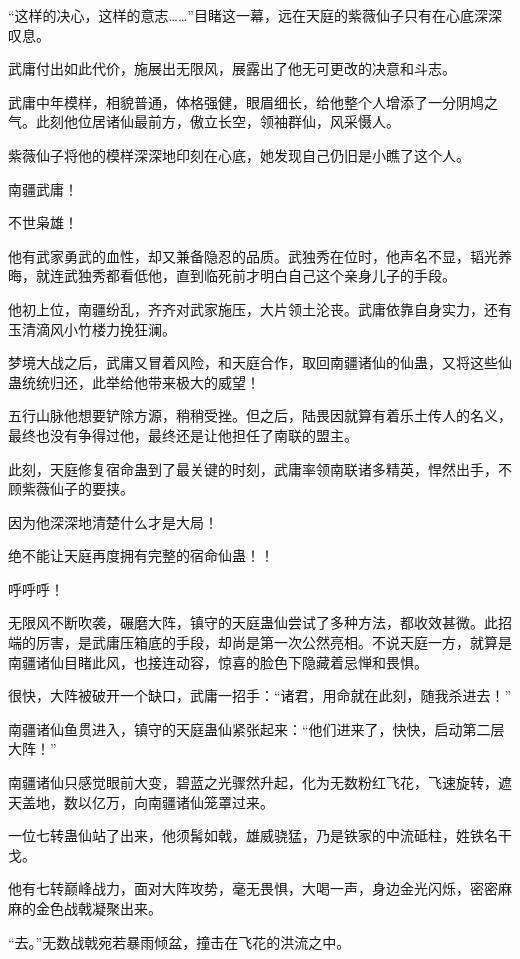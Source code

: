 \begin{this_body}
“这样的决心，这样的意志……”目睹这一幕，远在天庭的紫薇仙子只有在心底深深叹息。

武庸付出如此代价，施展出无限风，展露出了他无可更改的决意和斗志。

武庸中年模样，相貌普通，体格强健，眼眉细长，给他整个人增添了一分阴鸠之气。此刻他位居诸仙最前方，傲立长空，领袖群仙，风采慑人。

紫薇仙子将他的模样深深地印刻在心底，她发现自己仍旧是小瞧了这个人。

南疆武庸！

不世枭雄！

他有武家勇武的血性，却又兼备隐忍的品质。武独秀在位时，他声名不显，韬光养晦，就连武独秀都看低他，直到临死前才明白自己这个亲身儿子的手段。

他初上位，南疆纷乱，齐齐对武家施压，大片领土沦丧。武庸依靠自身实力，还有玉清滴风小竹楼力挽狂澜。

梦境大战之后，武庸又冒着风险，和天庭合作，取回南疆诸仙的仙蛊，又将这些仙蛊统统归还，此举给他带来极大的威望！

五行山脉他想要铲除方源，稍稍受挫。但之后，陆畏因就算有着乐土传人的名义，最终也没有争得过他，最终还是让他担任了南联的盟主。

此刻，天庭修复宿命蛊到了最关键的时刻，武庸率领南联诸多精英，悍然出手，不顾紫薇仙子的要挟。

因为他深深地清楚什么才是大局！

绝不能让天庭再度拥有完整的宿命仙蛊！！

呼呼呼！

无限风不断吹袭，碾磨大阵，镇守的天庭蛊仙尝试了多种方法，都收效甚微。此招端的厉害，是武庸压箱底的手段，却尚是第一次公然亮相。不说天庭一方，就算是南疆诸仙目睹此风，也接连动容，惊喜的脸色下隐藏着忌惮和畏惧。

很快，大阵被破开一个缺口，武庸一招手：“诸君，用命就在此刻，随我杀进去！”

南疆诸仙鱼贯进入，镇守的天庭蛊仙紧张起来：“他们进来了，快快，启动第二层大阵！”

南疆诸仙只感觉眼前大变，碧蓝之光骤然升起，化为无数粉红飞花，飞速旋转，遮天盖地，数以亿万，向南疆诸仙笼罩过来。

一位七转蛊仙站了出来，他须髯如戟，雄威骁猛，乃是铁家的中流砥柱，姓铁名干戈。

他有七转巅峰战力，面对大阵攻势，毫无畏惧，大喝一声，身边金光闪烁，密密麻麻的金色战戟凝聚出来。

“去。”无数战戟宛若暴雨倾盆，撞击在飞花的洪流之中。


\end{this_body}
